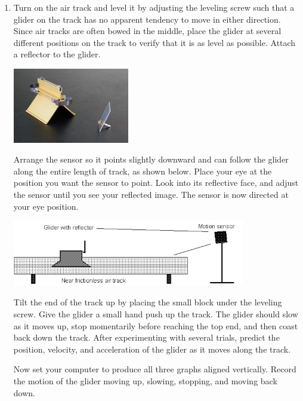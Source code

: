 \begin{enumerate}

\item Turn on the air track and level it by adjusting the leveling screw such that a glider on the track has no apparent tendency to move in either direction.  Since air tracks are often bowed in the middle, place the glider at several different positions on the track to verify that it is as level as possible.  Attach a reflector to the glider.
\begin{center} \includegraphics*[width=0.4\textwidth]{imgs/6labs/6Alab/6Aexp2/6A-EXP2_gilder.jpg} \end{center}

Arrange the sensor so it points slightly downward and can follow the glider along the entire length of track, as shown below.  Place your eye at the position you want the sensor to point.  Look into its reflective face, and adjust the sensor until you see your reflected image.  The sensor is now directed at your eye position.
\begin{center} \includegraphics*[width=0.8\textwidth]{imgs/6labs/6Alab/6Aexp2/exp2_fig5fx_2.jpg} \end{center}

Tilt the end of the track up by placing the small block under the leveling screw.  Give the glider a small hand push up the track.  The glider should slow as it moves up, stop momentarily before reaching the top end, and then coast back down the track.  After experimenting with several trials, predict the position, velocity, and acceleration of the glider as it moves along the track.

Now set your computer to produce all three graphs aligned vertically.  Record the motion of the glider moving up, slowing, stopping, and moving back down.


\end{enumerate}
